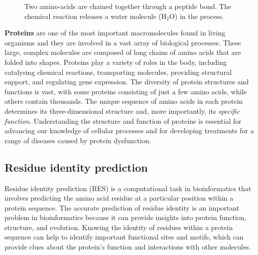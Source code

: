 \begin{figure}
    \centering
    \caption{Two amino-acids are chained together through a peptide bond. The chemical reaction releases a water molecule ($\text{H}_2\text{O}$) in the process.}
    \label{fig:residue}
\end{figure}
\textbf{Proteins} are one of the most important macromolecules found in living organisms and they are involved in a vast array of biological processes. 
These large, complex molecules are composed of long chains of amino acids that are folded into shapes.
Proteins play a variety of roles in the body, including catalysing chemical reactions, transporting molecules, providing structural support, and regulating gene expression. 
The diversity of protein structures and functions is vast, with some proteins consisting of just a few amino acids, while others contain thousands. 
The unique sequence of amino acids in each protein determines its three-dimensional structure and, more importantly, its \textit{specific function}. 
Understanding the structure and function of proteins is essential for advancing our knowledge of cellular processes and for developing treatments for a range of diseases caused by protein dysfunction.
\subsection{Residue identity prediction}
Residue identity prediction (RES) is a computational task in bioinformatics that involves predicting the amino acid residue at a particular position within a protein sequence. 
The accurate prediction of residue identity is an important problem in bioinformatics because it can provide insights into protein function, structure, and evolution. 
Knowing the identity of residues within a protein sequence can help to identify important functional sites and motifs, which can provide clues about the protein's function and interactions with other molecules. 

